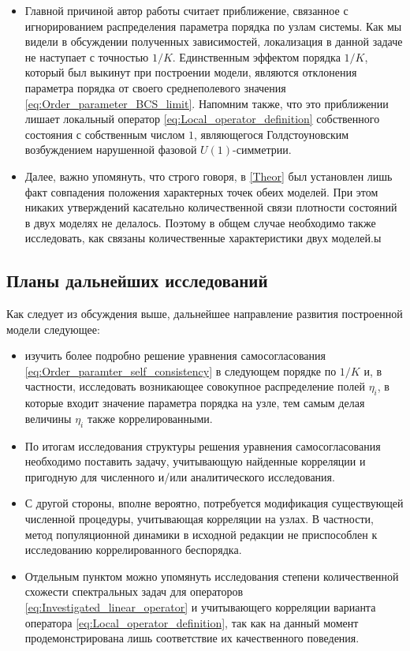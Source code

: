 \begin{itemize}	
	\item Главной причиной автор работы считает приближение, связанное с игнорированием распределения параметра порядка по узлам системы. Как мы видели в обсуждении полученных зависимостей, локализация в данной задаче не наступает с точностью $1/K$. Единственным эффектом порядка $1/K$, который был выкинут при построении модели, являются отклонения параметра порядка от своего среднеполевого значения \eqref{eq:Order_parameter_BCS_limit}. Напомним также, что это приближении лишает локальный оператор \eqref{eq:Local_operator_definition} собственного состояния с собственным числом $1$, являющегося Голдстоуновским возбуждением нарушенной фазовой $U(1)$-симметрии. 
	
	\item Далее, важно упомянуть, что строго говоря, в \autoref{Theor} был установлен лишь факт совпадения положения характерных точек обеих моделей. При этом никаких утверждений касательно количественной связи плотности состояний в двух моделях не делалось. Поэтому в общем случае необходимо также исследовать, как связаны количественные характеристики двух моделей.ы
\end{itemize}


\subsection{Планы дальнейших исследований}
Как следует из обсуждения выше, дальнейшее направление развития построенной модели следующее:
\begin{itemize}
	\item изучить более подробно решение уравнения самосогласования \eqref{eq:Order_paramter_self_consistency} в следующем порядке по $1/K$ и, в частности, исследовать возникающее совокупное распределение полей $\eta_i$, в которые входит значение параметра порядка на узле, тем самым делая величины $\eta_i$ также коррелированными.
	
	\item По итогам исследования структуры решения уравнения самосогласования необходимо поставить задачу, учитывающую найденные корреляции и пригодную для численного и/или аналитического исследования.
	
	\item С другой стороны, вполне вероятно, потребуется модификация существующей численной процедуры, учитывающая корреляции на узлах. В частности, метод популяционной динамики в исходной редакции не приспособлен к исследованию коррелированного беспорядка.
	
	\item Отдельным пунктом можно упомянуть исследования степени количественной схожести спектральных задач для операторов \eqref{eq:Investigated_linear_operator} и учитывающего корреляции варианта оператора \eqref{eq:Local_operator_definition}, так как на данный момент продемонстрирована лишь соответствие их качественного поведения.
\end{itemize}
